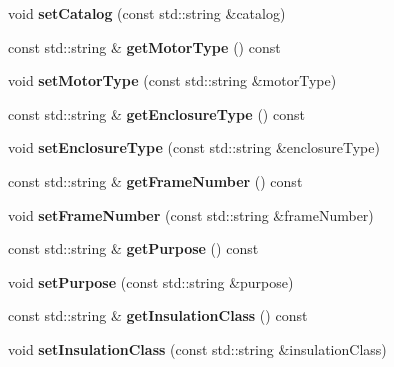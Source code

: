 \begin{DoxyCompactItemize}
\mbox{\label{class_motor_data_ac7e264252a15a63a2fd35cbb114478e6}} 
void {\bfseries set\+Catalog} (const std\+::string \&catalog)
\item 
\mbox{\label{class_motor_data_a070b07fa26bcbd9b4ca8ccf5770387e4}} 
const std\+::string \& {\bfseries get\+Motor\+Type} () const
\item 
\mbox{\label{class_motor_data_a3b3f78a7e8e45a94df538d7663d56256}} 
void {\bfseries set\+Motor\+Type} (const std\+::string \&motor\+Type)
\item 
\mbox{\label{class_motor_data_a4272913727c7a643a199f95dd6c0ce25}} 
const std\+::string \& {\bfseries get\+Enclosure\+Type} () const
\item 
\mbox{\label{class_motor_data_a7a6a1b8600a9c7481b32bf962edcef99}} 
void {\bfseries set\+Enclosure\+Type} (const std\+::string \&enclosure\+Type)
\item 
\mbox{\label{class_motor_data_a641faa7438d7f06d3d622f7f86d09481}} 
const std\+::string \& {\bfseries get\+Frame\+Number} () const
\item 
\mbox{\label{class_motor_data_afea21a449177b09087441c58f4b81a84}} 
void {\bfseries set\+Frame\+Number} (const std\+::string \&frame\+Number)
\item 
\mbox{\label{class_motor_data_ab2f4bd7d472dfa92850a542aefbdcd3c}} 
const std\+::string \& {\bfseries get\+Purpose} () const
\item 
\mbox{\label{class_motor_data_a1c1c332dc9d549a1a50a0e2d93ec413a}} 
void {\bfseries set\+Purpose} (const std\+::string \&purpose)
\item 
\mbox{\label{class_motor_data_aae4ce578d5c7517187fba692c8b93308}} 
const std\+::string \& {\bfseries get\+Insulation\+Class} () const
\item 
\mbox{\label{class_motor_data_a85cf8f4df6cacf6c637a3764a8a09dbf}} 
void {\bfseries set\+Insulation\+Class} (const std\+::string \&insulation\+Class)

\end{DoxyCompactItemize}
